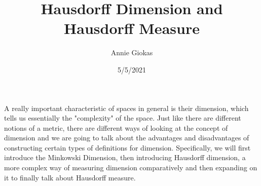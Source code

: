 \documentclass{article}
\begin{document}
\title{Hausdorff Dimension and Hausdorff Measure}
\author{Annie Giokas}
\date{5/5/2021}
\maketitle

\pagestyle{plain} 

\newenvironment{topic}[1]{\begin{trivlist}\item[]{\bf #1:}}{\end{trivlist}}

\newcommand{\N}{\mathbb{N}}
\newcommand{\Z}{\mathbb{Z}}
\newcommand{\R}{\mathbb{R}}
\newcommand{\Q}{\mathbb{Q}}

\newcommand{\C}{\mathcal{C}}
\newcommand{\B}{\mathcal{B}}
\newcommand{\T}{\mathcal{T}}
\newcommand{\U}{\mathcal{U}}
\newcommand{\D}{\mathcal{D}}
\newcommand{\J}{\mathcal{J}}
\renewcommand{\H}{\mathcal{H}}


\renewcommand{\qed}{\hfill \ensuremath{\Box}}

\newcommand*\interior[1]{\mathring{#1}}
\newcommand*\closure[1]{\overline{#1}} %
\newcommand*\boundary[1]{\partial {#1}}
\DeclarePairedDelimiter\ceil{\lceil}{\rceil}

\theoremstyle{definition}
\newtheorem{definition}{Definition}[section]
\newtheorem{example}{Example}[section]
\newtheorem{theorem}{Theorem}[section]
\newtheorem{corollary}{Corollary}[theorem]
\newtheorem{lemma}[theorem]{Lemma}

A really important characteristic of spaces in general is their dimension, which tells us essentially the "complexity" of the space. Just like there are different notions of a metric, there are different ways of looking at the concept of dimension and we are going to talk about the advantages and disadvantages of constructing certain types of definitions for dimension. Specifically, we will first introduce the Minkowski Dimension, then introducing Hausdorff dimension, a more complex way of measuring dimension comparatively and then expanding on it to finally talk about Hausdorff measure. 
\end{document}
